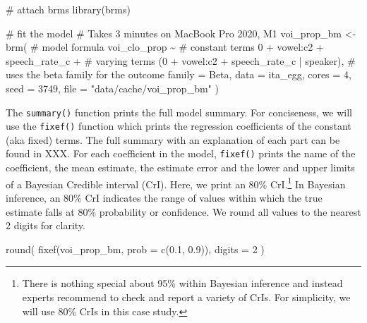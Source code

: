 \documentclass[
  authoryear,
  preprint,
  3p]{elsarticle}
\newenvironment{Shaded}{\begin{snugshade}}{\end{snugshade}}
\newcommand{\AttributeTok}[1]{\textcolor[rgb]{0.40,0.45,0.13}{#1}}
\newcommand{\CommentTok}[1]{\textcolor[rgb]{0.37,0.37,0.37}{#1}}
\newcommand{\DecValTok}[1]{\textcolor[rgb]{0.68,0.00,0.00}{#1}}
\newcommand{\FloatTok}[1]{\textcolor[rgb]{0.68,0.00,0.00}{#1}}
\newcommand{\FunctionTok}[1]{\textcolor[rgb]{0.28,0.35,0.67}{#1}}
\newcommand{\NormalTok}[1]{\textcolor[rgb]{0.00,0.23,0.31}{#1}}
\newcommand{\OtherTok}[1]{\textcolor[rgb]{0.00,0.23,0.31}{#1}}
\newcommand{\SpecialCharTok}[1]{\textcolor[rgb]{0.37,0.37,0.37}{#1}}
\newcommand{\StringTok}[1]{\textcolor[rgb]{0.13,0.47,0.30}{#1}}
\begin{document}
\begin{Shaded}
\begin{Highlighting}[]
\CommentTok{\# attach brms}
\FunctionTok{library}\NormalTok{(brms)}

\CommentTok{\# fit the model}
\CommentTok{\# Takes 3 minutes on MacBook Pro 2020, M1}
\NormalTok{voi\_prop\_bm }\OtherTok{\textless{}{-}} \FunctionTok{brm}\NormalTok{(}
  \CommentTok{\# model formula}
\NormalTok{  voi\_clo\_prop }\SpecialCharTok{\textasciitilde{}}
    \CommentTok{\# constant terms}
    \DecValTok{0} \SpecialCharTok{+}\NormalTok{ vowel}\SpecialCharTok{:}\NormalTok{c2 }\SpecialCharTok{+}\NormalTok{ speech\_rate\_c }\SpecialCharTok{+}
    \CommentTok{\# varying terms}
\NormalTok{    (}\DecValTok{0} \SpecialCharTok{+}\NormalTok{ vowel}\SpecialCharTok{:}\NormalTok{c2 }\SpecialCharTok{+}\NormalTok{ speech\_rate\_c }\SpecialCharTok{|}\NormalTok{ speaker),}
  \CommentTok{\# uses the beta family for the outcome}
  \AttributeTok{family =}\NormalTok{ Beta,}
  \AttributeTok{data =}\NormalTok{ ita\_egg,}
  \AttributeTok{cores =} \DecValTok{4}\NormalTok{,}
  \AttributeTok{seed =} \DecValTok{3749}\NormalTok{,}
  \AttributeTok{file =} \StringTok{"data/cache/voi\_prop\_bm"}
\NormalTok{)}
\end{Highlighting}
\end{Shaded}

The \texttt{summary()} function prints the full model summary. For
conciseness, we will use the \texttt{fixef()} function which prints the
regression coefficients of the constant (aka fixed) terms. The full
summary with an explanation of each part can be found in XXX. For each
coefficient in the model, \texttt{fixef()} prints the name of the
coefficient, the mean estimate, the estimate error and the lower and
upper limits of a Bayesian Credible interval (CrI). Here, we print an
80\% CrI.\footnote{There is nothing special about 95\% within Bayesian
  inference and instead experts recommend to check and report a variety
  of CrIs. For simplicity, we will use 80\% CrIs in this case study.} In
Bayesian inference, an 80\% CrI indicates the range of values within
which the true estimate falls at 80\% probability or confidence. We
round all values to the nearest 2 digits for clarity.

\begin{Shaded}
\begin{Highlighting}[]
\FunctionTok{round}\NormalTok{(}
  \FunctionTok{fixef}\NormalTok{(voi\_prop\_bm, }\AttributeTok{prob =} \FunctionTok{c}\NormalTok{(}\FloatTok{0.1}\NormalTok{, }\FloatTok{0.9}\NormalTok{)),}
  \AttributeTok{digits =} \DecValTok{2}
\NormalTok{)}
\end{Highlighting}
\end{Shaded}
\end{document}
